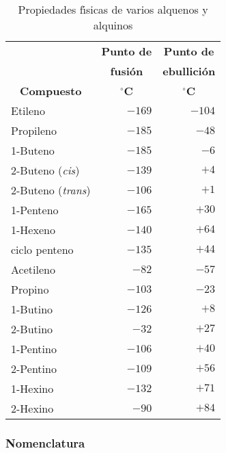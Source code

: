 \begin{table}[hbt]
\caption[Propiedades de Insaturados]{Propiedades f\'{\i}sicas de varios alquenos y alquinos}
\label{prop:1}
\begin{center}
{\small \begin{tabular}{lr r}\hline
&\multicolumn{1}{c}{\textbf{Punto de}}&
\multicolumn{1}{c}{\textbf{Punto de }}\\ 
&\multicolumn{1}{c}{\textbf{ fusi\'on}}&
\multicolumn{1}{c}{\textbf{ ebullici\'on}}\\
\multicolumn{1}{c}{\textbf{Compuesto}} &\multicolumn{1}{c}{$^\circ$\textbf{C}}&
\multicolumn{1}{c}{$^\circ$\textbf{C}}\\\hline
 Etileno &                  $-169$& $-104$\\
 Propileno&               $-185$& $-48$ \\
1-Buteno&                 $-185$& $-6$\\
2-Buteno (\textit{cis})&  $-139$& $+4$ \\
2-Buteno (\textit{trans})&$-106$& $+1$ \\
1-Penteno                &$-165$& $+30$ \\
1-Hexeno                & $-140$& $+64$\\
ciclo penteno           &$-135$& $+44$\\
 Acetileno                 &$  -82$& $-57$\\
 Propino                   &$-103$& $-23$\\
 1-Butino                  &$-126$& $+8$\\
2-Butino                 &$   -32$& $+27$\\ 
1-Pentino                &$-106$& $+40$\\
2-Pentino                &$-109$& $+56$\\
1-Hexino                 &$-132$& $+71$\\
2-Hexino                 &$  -90$& $+84$\\
\hline \hline
\end{tabular}}
\end{center}
\end{table}


\subsubsection{Nomenclatura}


